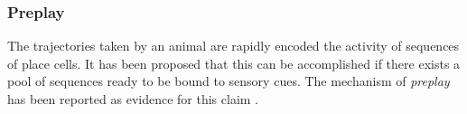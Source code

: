 \subsubsection{Preplay}
The trajectories taken by an animal are rapidly encoded the activity of sequences of place cells. It has been proposed that this can be accomplished if there exists a pool of sequences ready to be bound to sensory cues. The mechanism of \emph{preplay} has been reported as evidence for this claim  \cite{Dragoi2011, Dragoi2013a}. 
